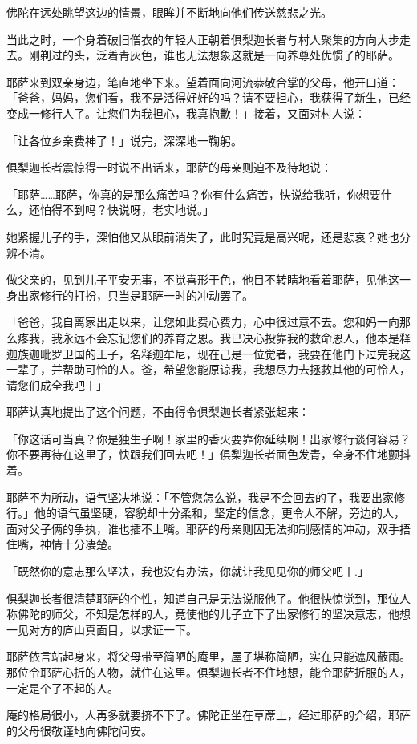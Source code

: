 \documentclass[12pt,twoside,openany]{book}
\begin{document}
佛陀在远处眺望这边的情景，眼眸并不断地向他们传送慈悲之光。

当此之时，一个身着破旧僧衣的年轻人正朝着俱梨迦长者与村人聚集的方向大步走去。刚剃过的头，泛着青灰色，谁也无法想象这就是一向养尊处优惯了的耶萨。

耶萨来到双亲身边，笔直地坐下来。望着面向河流恭敬合掌的父母，他开口道：「爸爸，妈妈，您们看，我不是活得好好的吗？请不要担心，我获得了新生，已经变成一修行人了。让您们为我担心，我真抱歉！」接着，又面对村人说：

「让各位乡亲费神了！」说完，深深地一鞠躬。

俱梨迦长者震惊得一时说不出话来，耶萨的母亲则迫不及待地说：

「耶萨……耶萨，你真的是那么痛苦吗？你有什么痛苦，快说给我听，你想要什么，还怕得不到吗？快说呀，老实地说。」

她紧握儿子的手，深怕他又从眼前消失了，此时究竟是高兴呢，还是悲哀？她也分辨不清。

做父亲的，见到儿子平安无事，不觉喜形于色，他目不转睛地看着耶萨，见他这一身出家修行的打扮，只当是耶萨一时的冲动罢了。

「爸爸，我自离家出走以来，让您如此费心费力，心中很过意不去。您和妈一向那么疼我，我永远不会忘记您们的养育之恩。我已决心投靠我的救命恩人，他本是释迦族迦毗罗卫国的王子，名释迦牟尼，现在己是一位觉者，我要在他门下过完我这一辈子，并帮助可怜的人。爸，希望您能原谅我，我想尽力去拯救其他的可怜人，请您们成全我吧丨」

耶萨认真地提出了这个问题，不由得令俱梨迦长者紧张起来：

「你这话可当真？你是独生子啊！家里的香火要靠你延续啊！出家修行谈何容易？你不要再待在这里了，快跟我们回去吧！」俱梨迦长者面色发青，全身不住地颤抖着。

耶萨不为所动，语气坚决地说：「不管您怎么说，我是不会回去的了，我要出家修行。」他的语气虽坚硬，容貌却十分柔和，坚定的信念，更令人不解，旁边的人，面对父子俩的争执，谁也插不上嘴。耶萨的母亲则因无法抑制感情的冲动，双手捂住嘴，神情十分凄楚。

「既然你的意志那么坚决，我也没有办法，你就让我见见你的师父吧丨.」

俱梨迦长者很清楚耶萨的个性，知道自己是无法说服他了。他很快惊觉到，那位人称佛陀的师父，不知是怎样的人，竟使他的儿子立下了出家修行的坚决意志，他想一见对方的庐山真面目，以求证一下。

耶萨依言站起身来，将父母带至简陋的庵里，屋子堪称简陋，实在只能遮风蔽雨。那位令耶萨心折的人物，就住在这里。俱梨迦长者不住地想，能令耶萨折服的人，一定是个了不起的人。

庵的格局很小，人再多就要挤不下了。佛陀正坐在草蓆上，经过耶萨的介绍，耶萨的父母很敬谨地向佛陀问安。
\end{document}
